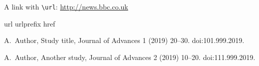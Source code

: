 \documentclass{article}
\begin{document}
\cite{bibkey1, bibkey2}

A link with \verb|\url|:
\url {http://news.bbc.co.uk}


\begin{thebibliography}{1}
\expandafter\ifx\csname url\endcsname\relax
  \def\url#1{\texttt{#1}}\fi
\expandafter\ifx\csname urlprefix\endcsname\relax\def\urlprefix{URL }\fi
\expandafter\ifx\csname href\endcsname\relax
  \def\href#1#2{#2} \def\path#1{#1}\fi

A.~Author, Study title, Journal of Advances 1 (2019) 20--30.
\newblock \href {http://dx.doi.org/101.999.2019} {\path{doi:101.999.2019}}.

A.~Author, Another study, Journal of Advances 2 (2019) 10--20.
\newblock \href {http://dx.doi.org/111.999.2019} {\path{doi:111.999.2019}}.

\end{thebibliography}
\end{document}
